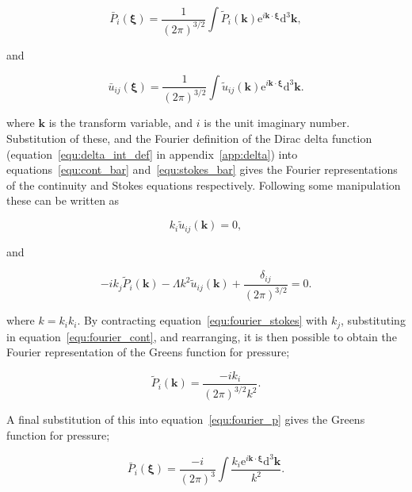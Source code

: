 \documentclass[12pt]{article}
\begin{document}
\begin{equation}
\label{equ:fourier_p}
\bar{P}_{i} (\boldsymbol\xi) = \frac{1}{(2 \pi)^{3/2}} \int \tilde{P}_{i} (\boldsymbol{k}) \mathrm{e}^{i \boldsymbol{k} \cdot \boldsymbol\xi} \mathrm{d}^{3} \boldsymbol{k} ,
\end{equation}

and 

\begin{equation}
\label{equ:fourier_vel}
\bar{u}_{ij} (\boldsymbol\xi) = \frac{1}{(2 \pi)^{3/2}} \int \tilde{u}_{ij} (\boldsymbol{k}) \mathrm{e}^{i \boldsymbol{k} \cdot \boldsymbol\xi} \mathrm{d}^{3} \boldsymbol{k} .
\end{equation}


where $\boldsymbol{k}$ is the transform variable, and $i$ is the unit imaginary number. Substitution of these, and the Fourier definition of the Dirac delta function (equation~\ref{equ:delta_int_def} in appendix~\ref{app:delta}) into equations~\ref{equ:cont_bar} and~\ref{equ:stokes_bar} gives the Fourier representations of the continuity and Stokes equations respectively. Following some manipulation these can be written as

\begin{equation}
\label{equ:fourier_cont}
k_{i} \tilde{u}_{ij} (\boldsymbol{k}) = 0 ,
\end{equation}

and

\begin{equation}
\label{equ:fourier_stokes}
-i k_{j} \tilde{P}_{i} (\boldsymbol{k}) - \Lambda k^{2} \tilde{u}_{ij} (\boldsymbol{k}) + \frac{\delta_{ij}}{(2 \pi)^{3/2}} = 0 .
\end{equation}

where $k = k_{i} k_{i}$. By contracting equation~\ref{equ:fourier_stokes} with $k_{j}$, substituting in equation~\ref{equ:fourier_cont}, and rearranging, it is then possible to obtain the Fourier representation of the Greens function for pressure;

\begin{equation}
\label{equ:fourier_green_p}
\tilde{P}_{i} (\boldsymbol{k}) = \frac{-i k_{i}}{(2 \pi)^{3/2} k^{2}}.
\end{equation}

A final substitution of this into equation~\ref{equ:fourier_p} gives the Greens function for pressure;

\begin{equation}
\label{equ:green_p_int}
\bar{P}_{i} (\boldsymbol\xi) = \frac{-i}{(2 \pi)^{3}} \int \frac{k_{i} \mathrm{e}^{i \boldsymbol{k} \cdot \boldsymbol{\xi}} \mathrm{d}^{3} \boldsymbol{k}}{k^{2}} .
\end{equation}
\end{document}

